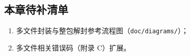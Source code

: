 \subsection{本章待补清单}\label{sec:multi-file-tbd}

\begin{enumerate}
  \item 多文件封装与整包解封参考流程图（\texttt{doc/diagrams/}）；
  \item 多文件相关错误码（附录 C）扩展。
\end{enumerate}
